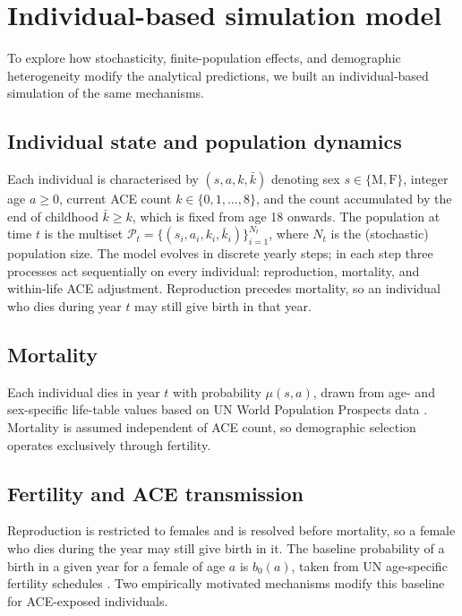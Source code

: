 \documentclass{article}
\begin{document}
\section{Individual-based simulation model}

To explore how stochasticity, finite-population effects, and demographic
heterogeneity modify the analytical predictions, we built an individual-based
simulation of the same mechanisms.

\subsection*{Individual state and population dynamics}

Each individual is characterised by \((s, a, k, \bar{k})\) denoting sex
\(s \in \{\text{M}, \text{F}\}\), integer age \(a \geq 0\), current ACE count
\(k \in \{0, 1, \dots, 8\}\), and the count accumulated by the end of childhood
\(\bar{k} \geq k\), which is fixed from age 18 onwards.  The population at time
\(t\) is the multiset
\(\mathcal{P}_t = \{(s_i, a_i, k_i, \bar{k}_i)\}_{i=1}^{N_t}\), where \(N_t\) is
the (stochastic) population size.  The model evolves in discrete yearly steps;
in each step three processes act sequentially on every individual:
reproduction, mortality, and within-life ACE adjustment.  Reproduction precedes
mortality, so an individual who dies during year \(t\) may still give birth in
that year.

\subsection*{Mortality}

Each individual dies in year \(t\) with probability \(\mu(s, a)\),
drawn from age- and sex-specific life-table values based on UN World Population
Prospects data \cite{un_wpp_mortality}.  Mortality is assumed independent of
ACE count, so demographic selection operates exclusively through fertility.

\subsection*{Fertility and ACE transmission}

Reproduction is restricted to females and is resolved before mortality, so a
female who dies during the year may still give birth in it.  The baseline
probability of a birth in a given year for a female of age \(a\) is
\(b_0(a)\), taken from UN
age-specific fertility schedules \cite{un_wpp_fertility}.  Two empirically
motivated mechanisms modify this baseline for ACE-exposed individuals.
\end{document}
